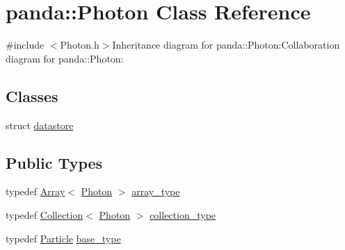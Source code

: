 \hypertarget{classpanda_1_1Photon}{
\section{panda::Photon Class Reference}
\label{classpanda_1_1Photon}
}


{\ttfamily \#include $<$Photon.h$>$}Inheritance diagram for panda::Photon:Collaboration diagram for panda::Photon:\subsection*{Classes}
\begin{DoxyCompactItemize}
\item 
struct \hyperlink{structpanda_1_1Photon_1_1datastore}{datastore}
\end{DoxyCompactItemize}
\subsection*{Public Types}
\begin{DoxyCompactItemize}
\item 
typedef \hyperlink{classpanda_1_1Array}{Array}$<$ \hyperlink{classpanda_1_1Photon}{Photon} $>$ \hyperlink{classpanda_1_1Photon_aae6023205ea85eb74f4870f012b302ce}{array\_\-type}
\item 
typedef \hyperlink{classpanda_1_1Collection}{Collection}$<$ \hyperlink{classpanda_1_1Photon}{Photon} $>$ \hyperlink{classpanda_1_1Photon_a76c4cc6e762c1d6785586b7546d2573f}{collection\_\-type}
\item 
typedef \hyperlink{classpanda_1_1Particle}{Particle} \hyperlink{classpanda_1_1Photon_a462a23e58af84e7c0eec1442206ccf04}{base\_\-type}
\end{DoxyCompactItemize}
